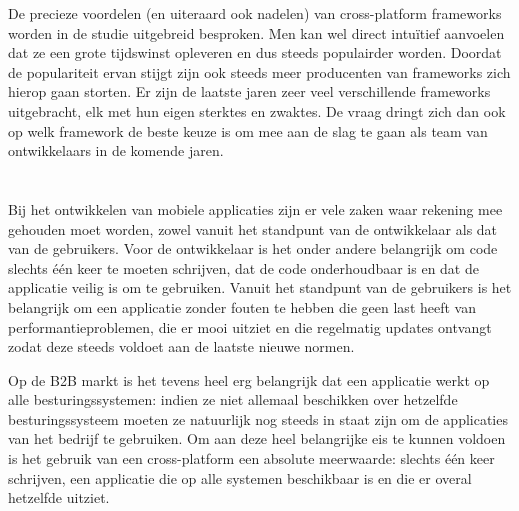 De precieze voordelen (en uiteraard ook nadelen) van cross-platform frameworks
worden in de studie uitgebreid besproken. Men kan wel direct intuïtief aanvoelen
dat ze een grote tijdswinst opleveren en dus steeds populairder worden. Doordat
de populariteit ervan stijgt zijn ook steeds meer producenten van frameworks
zich hierop gaan storten. Er zijn de laatste jaren zeer veel verschillende
frameworks uitgebracht, elk met hun eigen sterktes en zwaktes. De vraag dringt
zich dan ook op welk framework de beste keuze is om mee aan de slag te gaan als
team van ontwikkelaars in de komende jaren. 

\section{}
\label{sec:probleemstelling}


Bij het ontwikkelen van mobiele applicaties zijn er vele zaken waar rekening mee gehouden moet worden, zowel vanuit het standpunt van de ontwikkelaar als dat van de gebruikers. Voor de ontwikkelaar is het onder andere belangrijk om code slechts één keer te moeten schrijven, dat de code onderhoudbaar is en dat de applicatie veilig is om te gebruiken. Vanuit het standpunt van de gebruikers is het belangrijk om een applicatie zonder fouten te hebben die geen last heeft van performantieproblemen, die er mooi uitziet en die regelmatig updates ontvangt zodat deze steeds voldoet aan de laatste nieuwe normen. 

Op de B2B markt is het tevens heel erg belangrijk dat een applicatie werkt op alle besturingssystemen: indien ze niet allemaal beschikken over hetzelfde besturingssysteem moeten ze natuurlijk nog steeds in staat zijn om de applicaties van het bedrijf te gebruiken. Om aan deze heel belangrijke eis te kunnen voldoen is het gebruik van een cross-platform een absolute meerwaarde: slechts één keer schrijven, een applicatie die op alle systemen beschikbaar is en die er overal hetzelfde uitziet. 

